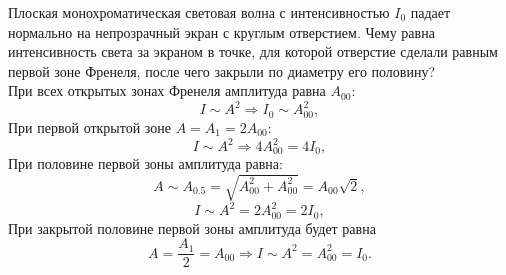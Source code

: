 \documentclass[__main__.tex]{subfiles}
\begin{document}
Плоская монохроматическая световая волна с интенсивностью $I_0$ падает нормально на непрозрачный экран с круглым отверстием. Чему равна интенсивность света за экраном в точке, для которой отверстие сделали равным первой зоне Френеля, после чего закрыли по диаметру его половину?\\ 

При всех открытых зонах Френеля амплитуда равна $A_{00}$:
$$
I\sim{A^2}\Rightarrow{I_0}\sim{A_{00}^2},
$$
При первой открытой зоне $A=A_1=2A_{00}$:
$$
I\sim{A^2}\Rightarrow{4A_{00}^2 = 4I_0},
$$
При половине первой зоны амплитуда равна:
$$
A\sim{A_{0.5}}=\sqrt{A_{00}^2+A_{00}^2}=A_{00}\sqrt{2},
$$
$$
I\sim{A^2}=2A_{00}^2=2I_0,
$$
При закрытой половине первой зоны амплитуда будет равна 
$$
A=\frac{A_1}{2}=A_{00}\Rightarrow{I}\sim{A^2}=A_{00}^2=I_0.
$$
\end{document}
